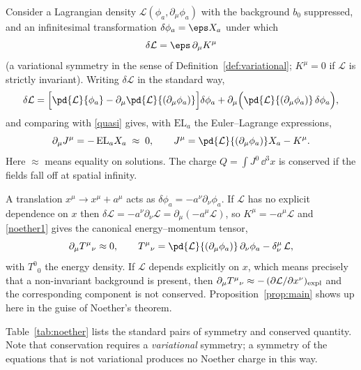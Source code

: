 Consider a Lagrangian density $\mathcal L(\phi_a,\partial_\mu\phi_a)$ with
the background $b_0$ suppressed, and an infinitesimal transformation
$\delta\phi_a=\eps X_a$ under which
\begin{equation}\label{quasi}
  \delta\mathcal L=\eps\,\partial_\mu K^\mu
\end{equation}
(a variational symmetry in the sense of Definition~\ref{def:variational};
$K^\mu=0$ if $\mathcal L$ is strictly invariant). Writing $\delta\mathcal L$
in the standard way,
\begin{equation}
  \delta\mathcal L
  =\Big[\pd{\mathcal L}{\phi_a}-\partial_\mu\pd{\mathcal L}{(\partial_\mu\phi_a)}\Big]\delta\phi_a
   +\partial_\mu\Big(\pd{\mathcal L}{(\partial_\mu\phi_a)}\,\delta\phi_a\Big),
\end{equation}
and comparing with \eqref{quasi} gives, with $\mathrm{EL}_a$ the
Euler--Lagrange expressions,
\begin{equation}\label{noether1}
  \partial_\mu J^\mu=-\,\mathrm{EL}_a X_a\;\approx\;0,
  \qquad
  J^\mu=\pd{\mathcal L}{(\partial_\mu\phi_a)}X_a-K^\mu .
\end{equation}
Here $\approx$ means equality on solutions. The charge
$Q=\int J^0\,\dd^3x$ is conserved if the fields fall off at spatial infinity.

\begin{example}[Translations]\label{ex:translations}
A translation $x^\mu\to x^\mu+a^\mu$ acts as $\delta\phi_a=-a^\nu\partial_\nu\phi_a$.
If $\mathcal L$ has no explicit dependence on $x$ then
$\delta\mathcal L=-a^\nu\partial_\nu\mathcal L=\partial_\mu(-a^\mu\mathcal L)$,
so $K^\mu=-a^\mu\mathcal L$ and \eqref{noether1} gives the canonical
energy--momentum tensor,
\begin{equation}
  \partial_\mu T^\mu{}_\nu\approx0,\qquad
  T^\mu{}_\nu=\pd{\mathcal L}{(\partial_\mu\phi_a)}\,\partial_\nu\phi_a-\delta^\mu_\nu\,\mathcal L,
\end{equation}
with $T^0{}_0$ the energy density. If $\mathcal L$ depends explicitly on $x$,
which means precisely that a non-invariant background is present, then
$\partial_\mu T^\mu{}_\nu\approx-\,(\partial\mathcal L/\partial x^\nu)_{\rm expl}$
and the corresponding component is not conserved. Proposition~\ref{prop:main}
shows up here in the guise of Noether's theorem.
\end{example}

Table~\ref{tab:noether} lists the standard pairs of symmetry and conserved
quantity. Note that conservation requires a \emph{variational} symmetry; a
symmetry of the equations that is not variational produces no Noether charge
in this way.

